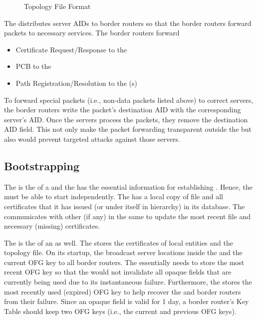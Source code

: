 \begin{figure}[h]
\centering
\begin{center}
\end{center}
\caption{Topology File Format}\label{fig:topology-file}
\end{figure}


The \CS distributes server AIDs to border routers so that the border routers forward packets to necessary services. The border routers forward
\begin{itemize}
\item Certificate Request/Response to the \CS
\item PCB to the \BS
\item Path Registration/Resolution to the \PS(s)
\end{itemize}

To forward special packets (i.e., non-data packets listed above) to correct servers, the border routers write the packet's destination AID with the corresponding server's AID. Once the servers process the packets, they remove the destination AID field. This not only make the packet forwarding transparent outside the \AD but also would prevent targeted attacks against those servers.

\subsection{Bootstrapping}
\noindent {\bf \TDC \CS: }
The \TDC is the \RT of a \TD and the \TDC \CS has the essential information for establishing \RT. Hence, the \TDC \CS must be able to start independently. The \TDC \CS has a local copy of \RT file and all \AD certificates that it has issued (or under itself in \TDC hierarchy) in its database. The \TDC \CS communicates with other \TDC \CSs (if any) in the same \TD to update the most recent \RT file and necessary (missing) certificates.

\noindent {\bf \AD \CS: } The \CS is the \RT of an \AD as well. The \CS stores the certificates of local entities and the topology file. On its startup, the \CS broadcast server locations inside the \AD and the current OFG key to all border routers. The \CS essentially needs to store the most recent OFG key so that the \CS would not invalidate all opaque fields that are currently being used due to its instantaneous failure. Furthermore, the \CS stores the most recently used (expired) OFG key to help recover the \BS and border routers from their failure. Since an opaque field is valid for 1 day, a border router's Key Table should keep two OFG keys (i.e., the current and previous OFG keys).

